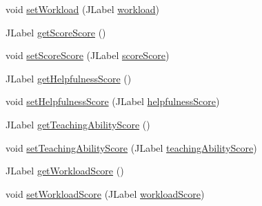 \begin{DoxyCompactItemize}
\item 
void \mbox{\hyperlink{classcom_1_1_b_n_u_1_1pages_1_1teacher__review_1_1_teacher_review_model_af34d53b3d294af93e7b63693d40bbae5}{set\+Workload}} (J\+Label \mbox{\hyperlink{classcom_1_1_b_n_u_1_1pages_1_1teacher__review_1_1_teacher_review_model_a859f6964a50d667716e5f30e8d52223c}{workload}})
\item 
J\+Label \mbox{\hyperlink{classcom_1_1_b_n_u_1_1pages_1_1teacher__review_1_1_teacher_review_model_a3ebc41875d4eb0a73c17b951ce47c317}{get\+Score\+Score}} ()
\item 
void \mbox{\hyperlink{classcom_1_1_b_n_u_1_1pages_1_1teacher__review_1_1_teacher_review_model_a66249ca8b7b1aa01df5f4b4ebc14d196}{set\+Score\+Score}} (J\+Label \mbox{\hyperlink{classcom_1_1_b_n_u_1_1pages_1_1teacher__review_1_1_teacher_review_model_aec9cb51d83992d831dd41cc63803bc7f}{score\+Score}})
\item 
J\+Label \mbox{\hyperlink{classcom_1_1_b_n_u_1_1pages_1_1teacher__review_1_1_teacher_review_model_a3edeed844a016dfb00282af049e954c8}{get\+Helpfulness\+Score}} ()
\item 
void \mbox{\hyperlink{classcom_1_1_b_n_u_1_1pages_1_1teacher__review_1_1_teacher_review_model_a0a072dc8120602b5162fed9ea93fa0ee}{set\+Helpfulness\+Score}} (J\+Label \mbox{\hyperlink{classcom_1_1_b_n_u_1_1pages_1_1teacher__review_1_1_teacher_review_model_a6dcb61e18da092553279ba131dd14f2d}{helpfulness\+Score}})
\item 
J\+Label \mbox{\hyperlink{classcom_1_1_b_n_u_1_1pages_1_1teacher__review_1_1_teacher_review_model_a9683888907c854c1d101b736a428055c}{get\+Teaching\+Ability\+Score}} ()
\item 
void \mbox{\hyperlink{classcom_1_1_b_n_u_1_1pages_1_1teacher__review_1_1_teacher_review_model_aaf3ba86357bfe93ffa33ed42c9195f5c}{set\+Teaching\+Ability\+Score}} (J\+Label \mbox{\hyperlink{classcom_1_1_b_n_u_1_1pages_1_1teacher__review_1_1_teacher_review_model_a579a2f058cbf0974b52d378b74e88f3c}{teaching\+Ability\+Score}})
\item 
J\+Label \mbox{\hyperlink{classcom_1_1_b_n_u_1_1pages_1_1teacher__review_1_1_teacher_review_model_ab82c4101f3935668f6d0870878983d45}{get\+Workload\+Score}} ()
\item 
void \mbox{\hyperlink{classcom_1_1_b_n_u_1_1pages_1_1teacher__review_1_1_teacher_review_model_a477b9ef43ce54010498a3ea0b3a45cab}{set\+Workload\+Score}} (J\+Label \mbox{\hyperlink{classcom_1_1_b_n_u_1_1pages_1_1teacher__review_1_1_teacher_review_model_a1c1f9caabc03e83bfee95709b864c027}{workload\+Score}})
\item 

\end{DoxyCompactItemize}
